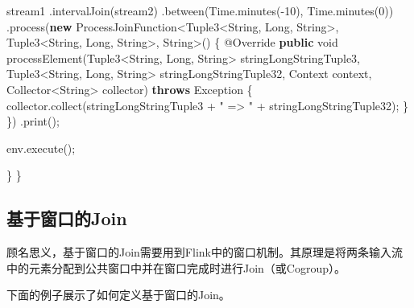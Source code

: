 \documentclass[cn,11pt,chinese]{elegantbook}
\newenvironment{Shaded}{}{}
\newcommand{\AttributeTok}[1]{\textcolor[rgb]{0.49,0.56,0.16}{#1}}
\newcommand{\BuiltInTok}[1]{#1}
\newcommand{\DataTypeTok}[1]{\textcolor[rgb]{0.56,0.13,0.00}{#1}}
\newcommand{\DecValTok}[1]{\textcolor[rgb]{0.25,0.63,0.44}{#1}}
\newcommand{\FunctionTok}[1]{\textcolor[rgb]{0.02,0.16,0.49}{#1}}
\newcommand{\KeywordTok}[1]{\textcolor[rgb]{0.00,0.44,0.13}{\textbf{#1}}}
\newcommand{\NormalTok}[1]{#1}
\newcommand{\StringTok}[1]{\textcolor[rgb]{0.25,0.44,0.63}{#1}}
\begin{document}
\begin{Shaded}
\begin{Highlighting}[]
\NormalTok{        stream1}
\NormalTok{            .}\FunctionTok{intervalJoin}\NormalTok{(stream2)}
\NormalTok{            .}\FunctionTok{between}\NormalTok{(}\BuiltInTok{Time}\NormalTok{.}\FunctionTok{minutes}\NormalTok{({-}}\DecValTok{10}\NormalTok{), }\BuiltInTok{Time}\NormalTok{.}\FunctionTok{minutes}\NormalTok{(}\DecValTok{0}\NormalTok{))}
\NormalTok{            .}\FunctionTok{process}\NormalTok{(}\KeywordTok{new}\NormalTok{ ProcessJoinFunction\textless{}Tuple3\textless{}}\BuiltInTok{String}\NormalTok{, }\BuiltInTok{Long}\NormalTok{, }\BuiltInTok{String}\NormalTok{\textgreater{}, Tuple3\textless{}}\BuiltInTok{String}\NormalTok{, }\BuiltInTok{Long}\NormalTok{, }\BuiltInTok{String}\NormalTok{\textgreater{}, }\BuiltInTok{String}\NormalTok{\textgreater{}() \{}
                \AttributeTok{@Override}
                \KeywordTok{public} \DataTypeTok{void} \FunctionTok{processElement}\NormalTok{(Tuple3\textless{}}\BuiltInTok{String}\NormalTok{, }\BuiltInTok{Long}\NormalTok{, }\BuiltInTok{String}\NormalTok{\textgreater{} stringLongStringTuple3, Tuple3\textless{}}\BuiltInTok{String}\NormalTok{, }\BuiltInTok{Long}\NormalTok{, }\BuiltInTok{String}\NormalTok{\textgreater{} stringLongStringTuple32, }\BuiltInTok{Context}\NormalTok{ context, Collector\textless{}}\BuiltInTok{String}\NormalTok{\textgreater{} collector) }\KeywordTok{throws} \BuiltInTok{Exception}\NormalTok{ \{}
\NormalTok{                    collector.}\FunctionTok{collect}\NormalTok{(stringLongStringTuple3 + }\StringTok{" =\textgreater{} "}\NormalTok{ + stringLongStringTuple32);}
\NormalTok{                \}}
\NormalTok{            \})}
\NormalTok{            .}\FunctionTok{print}\NormalTok{();}

\NormalTok{        env.}\FunctionTok{execute}\NormalTok{();}

\NormalTok{    \}}
\NormalTok{\}}
\end{Highlighting}
\end{Shaded}

\hypertarget{ux57faux4e8eux7a97ux53e3ux7684join}{%
\subsection{基于窗口的Join}\label{ux57faux4e8eux7a97ux53e3ux7684join}}

顾名思义，基于窗口的Join需要用到Flink中的窗口机制。其原理是将两条输入流中的元素分配到公共窗口中并在窗口完成时进行Join（或Cogroup）。

下面的例子展示了如何定义基于窗口的Join。
\end{document}
